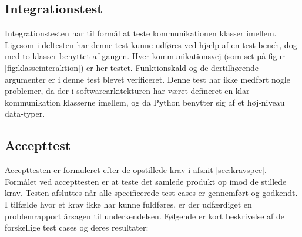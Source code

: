 \documentclass[rapport.tex]{subfiles}
\begin{document}
	\subsection{Integrationstest}
	Integrationstesten har til formål at teste kommunikationen klasser imellem.  Ligesom i deltesten har denne test kunne udføres ved hjælp af en test-bench, dog med to klasser benyttet af gangen. Hver kommunikationsvej (som set på figur \ref{fig:klasseinteraktion}) er her testet. Funktionskald og de dertilhørende argumenter er i denne test blevet verificeret. 
	Denne test har ikke medført nogle problemer, da der i softwarearkitekturen har været defineret en klar kommunikation klasserne imellem, og da Python benytter sig af et høj-niveau data-typer.
	
	\subsection{Accepttest}
	Accepttesten er formuleret efter de opstillede krav i afsnit \ref{sec:kravspec}. Formålet ved accepttesten er at teste det samlede produkt op imod de stillede krav. Testen afsluttes når alle specificerede test cases er gennemført og godkendt. I tilfælde hvor et krav ikke har kunne fuldføres, er der udfærdiget en problemrapport årsagen til underkendelsen. 
	Følgende er kort beskrivelse af de forskellige test cases og deres resultater: 
\end{document}
